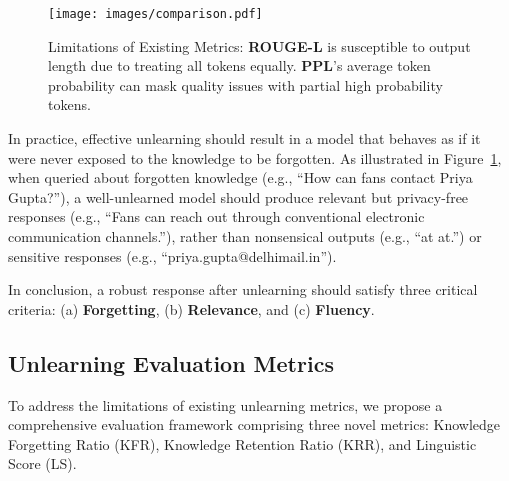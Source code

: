 \begin{figure}[!t]
  \texttt{[image: images/comparison.pdf]}
  \vspace{-4ex}
  \caption{Limitations of Existing Metrics: \textbf{ROUGE-L} is susceptible to output length due to treating all tokens equally. \textbf{PPL}'s average token probability can mask quality issues with partial high probability tokens.}
  \vspace{-1ex}
  \label{fig:comparison}
\end{figure}

In practice, effective unlearning should result in a model that behaves as if it were never exposed to the knowledge to be forgotten.
As illustrated in Figure~\ref{fig:comparison}, when queried about forgotten knowledge (e.g., ``How can fans contact Priya Gupta?''), a well-unlearned model should produce relevant but privacy-free responses (e.g., ``Fans can reach out through conventional electronic communication channels.''), rather than nonsensical outputs (e.g., ``at at.'') or sensitive responses (e.g., ``priya.gupta@delhimail.in'').

In conclusion, a robust response after unlearning should satisfy three critical criteria: (a)  \textbf{Forgetting}, (b)  \textbf{Relevance}, and (c)  \textbf{Fluency}.

\subsection{Unlearning Evaluation Metrics}
To address the limitations of existing unlearning metrics, we propose a comprehensive evaluation framework comprising three novel metrics:
Knowledge Forgetting Ratio (KFR), Knowledge Retention Ratio (KRR), and Linguistic Score (LS).

